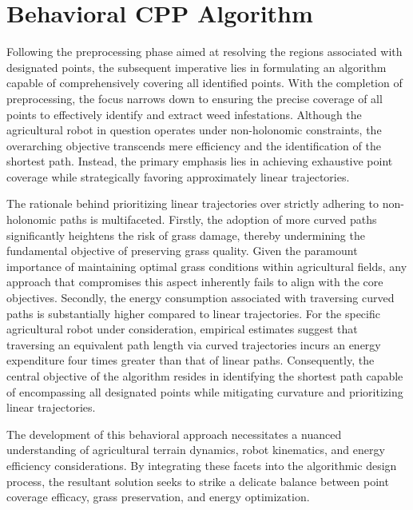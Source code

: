 
\section{Behavioral CPP Algorithm}

Following the preprocessing phase aimed at resolving the regions associated with designated points, the subsequent imperative lies in formulating an algorithm capable of comprehensively covering all identified points. With the completion of preprocessing, the focus narrows down to ensuring the precise coverage of all points to effectively identify and extract weed infestations. Although the agricultural robot in question operates under non-holonomic constraints, the overarching objective transcends mere efficiency and the identification of the shortest path. Instead, the primary emphasis lies in achieving exhaustive point coverage while strategically favoring approximately linear trajectories.

\vspace{3mm}   

The rationale behind prioritizing linear trajectories over strictly adhering to non-holonomic paths is multifaceted. Firstly, the adoption of more curved paths significantly heightens the risk of grass damage, thereby undermining the fundamental objective of preserving grass quality. Given the paramount importance of maintaining optimal grass conditions within agricultural fields, any approach that compromises this aspect inherently fails to align with the core objectives. Secondly, the energy consumption associated with traversing curved paths is substantially higher compared to linear trajectories. For the specific agricultural robot under consideration, empirical estimates suggest that traversing an equivalent path length via curved trajectories incurs an energy expenditure four times greater than that of linear paths. Consequently, the central objective of the algorithm resides in identifying the shortest path capable of encompassing all designated points while mitigating curvature and prioritizing linear trajectories.

\vspace{3mm}  

The development of this behavioral approach necessitates a nuanced understanding of agricultural terrain dynamics, robot kinematics, and energy efficiency considerations. By integrating these facets into the algorithmic design process, the resultant solution seeks to strike a delicate balance between point coverage efficacy, grass preservation, and energy optimization.


